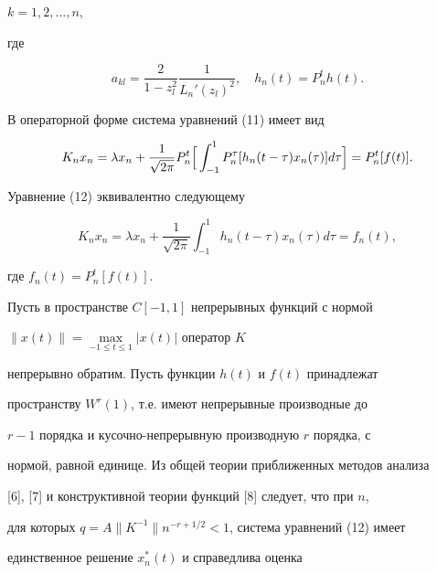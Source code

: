$k=1,2,\dotsc,n$,


где


$$


a_{kl}=\frac{2}{1-z_l^2}\frac{1}{L_n'(z_l)^2},\quad


h_n(t)=P_n^th(t).


$$





В операторной форме система уравнений (11) имеет вид


\begin{equation}


K_n x_n=\lambda x_n+\frac{1}{\sqrt{2\pi}}


P_n^t\Bigl[\,\int_{-1}^1 P_n^\tau [h_n(t-\tau) x_n


(\tau)] d\tau\Bigr]=P_n^t[f(t)].


\end{equation}





Уравнение (12) эквивалентно следующему


\begin{equation}


K_n x_n=\lambda x_n+\frac{1}{\sqrt{2\pi}}


\int_{-1}^1 h_n(t-\tau) x_n(\tau) d\tau=f_n(t),


\end{equation}


где $f_n(t)=P_n^t [f(t)]$.





Пусть в пространстве $C [-1,1]$ непрерывных функций с нормой


$\|x(t)\|=\max\limits_{-1\le t\le 1}|x(t)|$ оператор $K$


непрерывно обратим. Пусть функции $h(t)$ и $f(t)$ принадлежат


пространству $W^r(1)$, т.е. имеют непрерывные производные до


$r-1$ порядка и кусочно-непрерывную производную $r$ порядка, с


нормой, равной единице. Из общей теории приближенных методов анализа


[6], [7] и конструктивной теории функций [8] следует, что при $n$,


для которых $q=A\|K^{-1}\|n^{-r+1/2}<1$, система уравнений (12) имеет


единственное решение $x_n^* (t)$ и справедлива оценка


